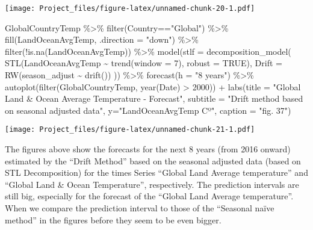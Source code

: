 \documentclass[
]{article}
\newenvironment{Shaded}{\begin{snugshade}}{\end{snugshade}}
\newcommand{\AttributeTok}[1]{\textcolor[rgb]{0.77,0.63,0.00}{#1}}
\newcommand{\ConstantTok}[1]{\textcolor[rgb]{0.00,0.00,0.00}{#1}}
\newcommand{\DecValTok}[1]{\textcolor[rgb]{0.00,0.00,0.81}{#1}}
\newcommand{\FunctionTok}[1]{\textcolor[rgb]{0.00,0.00,0.00}{#1}}
\newcommand{\NormalTok}[1]{#1}
\newcommand{\SpecialCharTok}[1]{\textcolor[rgb]{0.00,0.00,0.00}{#1}}
\newcommand{\StringTok}[1]{\textcolor[rgb]{0.31,0.60,0.02}{#1}}
\begin{document}
\texttt{[image: Project\_files/figure-latex/unnamed-chunk-20-1.pdf]}

\begin{Shaded}
\begin{Highlighting}[]
\NormalTok{GlobalCountryTemp }\SpecialCharTok{\%\textgreater{}\%} 
  \FunctionTok{filter}\NormalTok{(Country}\SpecialCharTok{==}\StringTok{"Global"}\NormalTok{) }\SpecialCharTok{\%\textgreater{}\%} 
  \FunctionTok{fill}\NormalTok{(LandOceanAvgTemp, }\AttributeTok{.direction =} \StringTok{"down"}\NormalTok{) }\SpecialCharTok{\%\textgreater{}\%}
  \FunctionTok{filter}\NormalTok{(}\SpecialCharTok{!}\FunctionTok{is.na}\NormalTok{(LandOceanAvgTemp)) }\SpecialCharTok{\%\textgreater{}\%} 
  \FunctionTok{model}\NormalTok{(}\AttributeTok{stlf =} \FunctionTok{decomposition\_model}\NormalTok{(}
    \FunctionTok{STL}\NormalTok{(LandOceanAvgTemp }\SpecialCharTok{\textasciitilde{}} \FunctionTok{trend}\NormalTok{(}\AttributeTok{window =} \DecValTok{7}\NormalTok{), }\AttributeTok{robust =} \ConstantTok{TRUE}\NormalTok{),}
        \AttributeTok{Drift =} \FunctionTok{RW}\NormalTok{(season\_adjust }\SpecialCharTok{\textasciitilde{}} \FunctionTok{drift}\NormalTok{())}
\NormalTok{    )) }\SpecialCharTok{\%\textgreater{}\%} 
  \FunctionTok{forecast}\NormalTok{(}\AttributeTok{h =} \StringTok{"8 years"}\NormalTok{) }\SpecialCharTok{\%\textgreater{}\%} 
  \FunctionTok{autoplot}\NormalTok{(}\FunctionTok{filter}\NormalTok{(GlobalCountryTemp, }\FunctionTok{year}\NormalTok{(Date) }\SpecialCharTok{\textgreater{}} \DecValTok{2000}\NormalTok{)) }\SpecialCharTok{+}
  \FunctionTok{labs}\NormalTok{(}\AttributeTok{title =} \StringTok{"Global Land \& Ocean Average Temperature {-} Forecast"}\NormalTok{,}
       \AttributeTok{subtitle =} \StringTok{"Drift method based on seasonal adjusted data"}\NormalTok{,}
       \AttributeTok{y=}\StringTok{"LandOceanAvgTemp Cº"}\NormalTok{,}
       \AttributeTok{caption =} \StringTok{"fig. 37"}\NormalTok{)}
\end{Highlighting}
\end{Shaded}

\texttt{[image: Project\_files/figure-latex/unnamed-chunk-21-1.pdf]}

The figures above show the forecasts for the next 8 years (from 2016
onward) estimated by the ``Drift Method'' based on the seasonal adjusted
data (based on STL Decomposition) for the times Series ``Global Land
Average temperature'' and ``Global Land \& Ocean Temperature'',
respectively. The prediction intervals are still big, especially for the
forecast of the ``Global Land Average temperature''. When we compare the
prediction interval to those of the ``Seasonal naïve method'' in the
figures before they seem to be even bigger.
\end{document}
